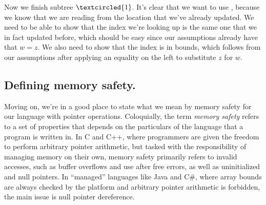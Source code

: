 \documentclass[11pt,twoside]{scrartcl}
\begin{document}
\begin{sequentdeduction}[array]
 {
}
\end{sequentdeduction}
Now we finish subtree $\textcircled{1}$.
It's clear that we want to use , because we know that we are reading from the location that we've already updated.
We need to be able to show that the index we're looking up is the same one that we in fact updated before, which should be easy since our assumptions already have that $w = z$.
We also need to show that the index is in bounds, which follows from our assumptions after applying an equality on the left to substitute $z$ for $w$.
\begin{sequentdeduction}[array]
 {
}
\end{sequentdeduction}

\subsection{Defining memory safety.} 
Moving on, we're in a good place to state what we mean by memory safety for our language with pointer operations.
Coloquially, the term \emph{memory safety} refers to a set of properties that depends on the particulars of the language that a program is written in.
In C and C++, where programmers are given the freedom to perform arbitrary pointer arithmetic, but tasked with the responsibility of managing memory on their own, memory safety primarily refers to invalid accesses, such as buffer overflows and use after free errors, as well as uninitialized and null pointers.
In ``managed'' languages like Java and C\#, where array bounds are always checked by the platform and arbitrary pointer arithmetic is forbidden, the main issue is null pointer dereference.
\end{document}

